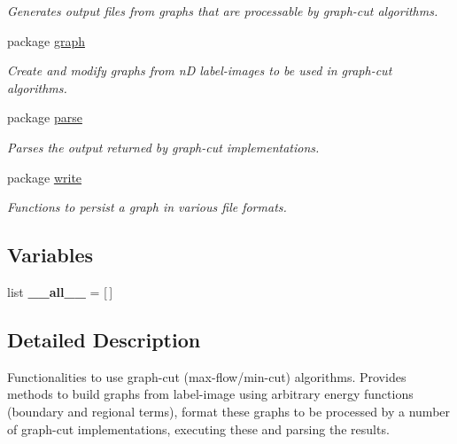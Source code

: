 \begin{DoxyCompactItemize}
\begin{DoxyCompactList}\small\item\em Generates output files from graphs that are processable by graph-\/cut algorithms. \end{DoxyCompactList}

\item 
package \hyperlink{namespacemedpy_1_1graphcut_1_1graph}{graph}


\begin{DoxyCompactList}\small\item\em Create and modify graphs from nD label-\/images to be used in graph-\/cut algorithms. \end{DoxyCompactList}

\item 
package \hyperlink{namespacemedpy_1_1graphcut_1_1parse}{parse}


\begin{DoxyCompactList}\small\item\em Parses the output returned by graph-\/cut implementations. \end{DoxyCompactList}

\item 
package \hyperlink{namespacemedpy_1_1graphcut_1_1write}{write}


\begin{DoxyCompactList}\small\item\em Functions to persist a graph in various file formats. \end{DoxyCompactList}

\end{DoxyCompactItemize}
\subsection*{Variables}
\begin{DoxyCompactItemize}
\item 
\hypertarget{namespacemedpy_1_1graphcut_aad412f9af7e17894cc03632be5905a54}{
list {\bfseries \_\-\_\-all\_\-\_\-} = \mbox{[}$\,$\mbox{]}}
\label{namespacemedpy_1_1graphcut_aad412f9af7e17894cc03632be5905a54}

\end{DoxyCompactItemize}


\subsection{Detailed Description}
Functionalities to use graph-\/cut (max-\/flow/min-\/cut) algorithms. Provides methods to build graphs from label-\/image using arbitrary energy functions (boundary and regional terms), format these graphs to be processed by a number of graph-\/cut implementations, executing these and parsing the results.

